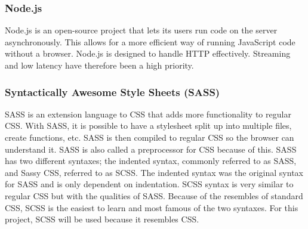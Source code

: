 


\subsubsection{Node.js}%
\label{ssub:Node}
Node.js is an open-source project that lets its users run code on the server asynchronously\cite{node.js}. This allows for a more efficient way of running JavaScript code without a browser. Node.js is designed to handle HTTP effectively. Streaming and low latency have therefore been a high priority. 


\subsubsection{Syntactically Awesome Style Sheets (SASS)}%
\label{sub:sass}
SASS is an extension language to CSS that adds more functionality to regular CSS. With SASS, it is possible to have a stylesheet split up into multiple files, create functions, etc. SASS is then compiled to regular CSS so the browser can understand it. SASS is also called a preprocessor for CSS because of this. SASS has two different syntaxes; the indented syntax, commonly referred to as SASS, and Sassy CSS, referred to as SCSS. The indented syntax was the original syntax for SASS and is only dependent on indentation. SCSS syntax is very similar to regular CSS but with the qualities of SASS. Because of the resembles of standard CSS, SCSS is the easiest to learn and most famous of the two syntaxes. For this project, SCSS will be used because it resembles CSS. 

